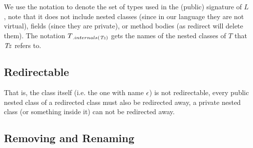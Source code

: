 \begin{defs}
	
\end{defs}

We use the notation  to denote the set of types used in the (public) signature of $L$, note that it does not include nested classes (since in our language they are not virtual),  fields (since they are private), or method bodies (as redirect will delete them). The notation $T{{}_{.{internals}({\mathit{Tz}})}}$ gets the names of the nested classes of $T$ that $\mathit{Tz}$ refers to. 

\subsection{Redirectable}
\begin{defs}
\end{defs}
That is, the class itself (i.e. the one with name $\epsilon$) is not redirectable, every public nested class of a redirected class must also be redirected away, a private nested class (or something inside it) can not be redirected away.


\subsection{Removing and Renaming}

